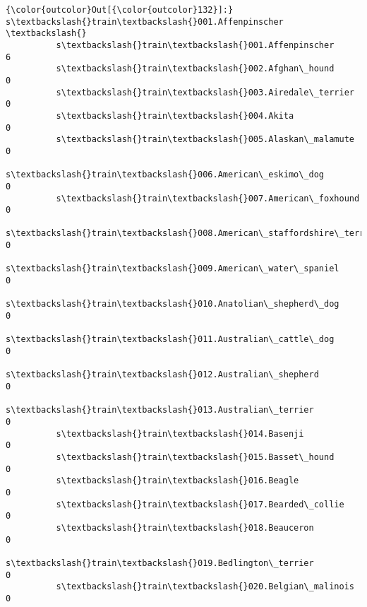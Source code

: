 \documentclass[11pt]{article}
\begin{document}
\begin{Verbatim}[commandchars=\\\{\}]
{\color{outcolor}Out[{\color{outcolor}132}]:}                                                 s\textbackslash{}train\textbackslash{}001.Affenpinscher  \textbackslash{}
          s\textbackslash{}train\textbackslash{}001.Affenpinscher                                               6   
          s\textbackslash{}train\textbackslash{}002.Afghan\_hound                                                0   
          s\textbackslash{}train\textbackslash{}003.Airedale\_terrier                                            0   
          s\textbackslash{}train\textbackslash{}004.Akita                                                       0   
          s\textbackslash{}train\textbackslash{}005.Alaskan\_malamute                                            0   
          s\textbackslash{}train\textbackslash{}006.American\_eskimo\_dog                                         0   
          s\textbackslash{}train\textbackslash{}007.American\_foxhound                                           0   
          s\textbackslash{}train\textbackslash{}008.American\_staffordshire\_terrier                              0   
          s\textbackslash{}train\textbackslash{}009.American\_water\_spaniel                                      0   
          s\textbackslash{}train\textbackslash{}010.Anatolian\_shepherd\_dog                                      0   
          s\textbackslash{}train\textbackslash{}011.Australian\_cattle\_dog                                       0   
          s\textbackslash{}train\textbackslash{}012.Australian\_shepherd                                         0   
          s\textbackslash{}train\textbackslash{}013.Australian\_terrier                                          0   
          s\textbackslash{}train\textbackslash{}014.Basenji                                                     0   
          s\textbackslash{}train\textbackslash{}015.Basset\_hound                                                0   
          s\textbackslash{}train\textbackslash{}016.Beagle                                                      0   
          s\textbackslash{}train\textbackslash{}017.Bearded\_collie                                              0   
          s\textbackslash{}train\textbackslash{}018.Beauceron                                                   0   
          s\textbackslash{}train\textbackslash{}019.Bedlington\_terrier                                          0   
          s\textbackslash{}train\textbackslash{}020.Belgian\_malinois                                            0   

\end{Verbatim}
\end{document}

